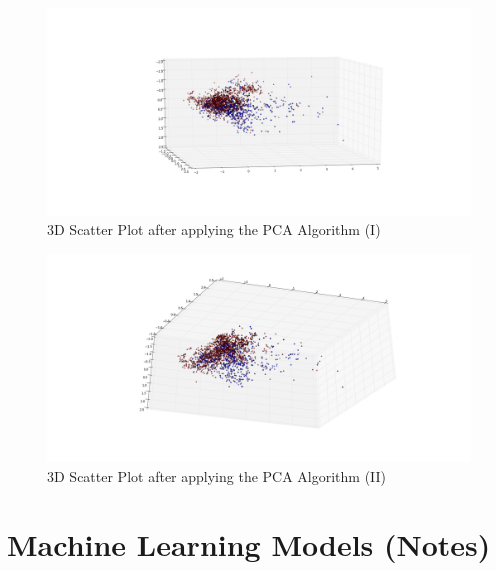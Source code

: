 \documentclass[a4paper,12pt]{report}
\begin{document}
						\begin{figure}[H]
							\centering
							\includegraphics[width=\textwidth,scale=1,totalheight=0.4\textheight]{images/scatter_pca_3D}
							\caption{3D Scatter Plot after applying the PCA Algorithm (I)}
							\label{fig:scatter_pca_3D}
						\end{figure}
						\begin{figure}[H]
							\centering
							\includegraphics[width=\textwidth,scale=1,totalheight=0.4\textheight]{images/scatter_pca_3D_2}
							\caption{3D Scatter Plot after applying the PCA Algorithm (II)}
							\label{fig:scatter_pca_3D_2}
						\end{figure}
	\section{Machine Learning Models (Notes)}
\end{document}
